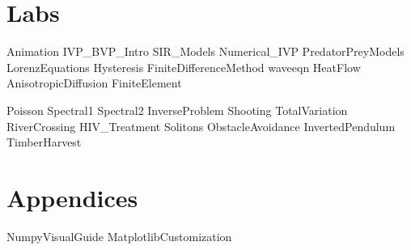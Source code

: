 \documentclass[opener-c,labs,green,nociteref]{HJnewsiambook}
\begin{document}
\part{Labs}
{Animation}
{IVP_BVP_Intro}
{SIR_Models}
{Numerical_IVP} 
{PredatorPreyModels}
{LorenzEquations}
{Hysteresis}
{FiniteDifferenceMethod}
{waveeqn}
{HeatFlow}
{AnisotropicDiffusion}
{FiniteElement}

{Poisson}
{Spectral1}
{Spectral2}
{InverseProblem}
{Shooting}
{TotalVariation}
{RiverCrossing}
{HIV_Treatment}
{Solitons}
{ObstacleAvoidance}
{InvertedPendulum}
{TimberHarvest}

\part{Appendices}
\begin{appendices}
{NumpyVisualGuide}
{MatplotlibCustomization}
\end{appendices}



\end{document}
